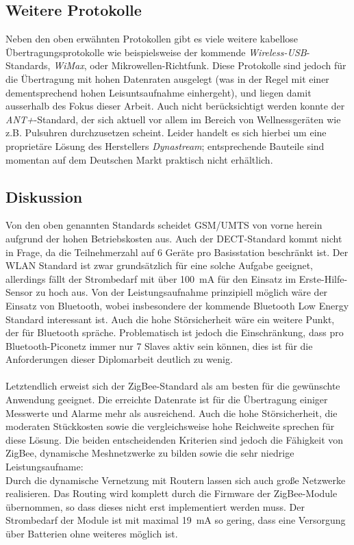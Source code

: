     \subsection{Weitere Protokolle}
        Neben den oben erwähnten Protokollen gibt es viele weitere kabellose Übertragungsprotokolle wie beispielsweise 
        der kommende \emph{Wireless-USB}-Standards, \emph{WiMax}, oder Mikrowellen-Richtfunk. Diese Protokolle sind 
        jedoch für die Übertragung mit hohen Datenraten ausgelegt (was in der Regel mit einer dementsprechend 
        hohen Leisuntsaufnahme einhergeht), und liegen damit ausserhalb des Fokus dieser Arbeit. Auch nicht
        berücksichtigt werden konnte der \emph{ANT+}-Standard, der sich aktuell vor allem im Bereich von Wellnessgeräten
        wie z.B. Pulsuhren durchzusetzen scheint. Leider handelt es sich hierbei um eine proprietäre Lösung des 
        Herstellers \emph{Dynastream}; entsprechende Bauteile sind momentan auf dem Deutschen Markt praktisch nicht
        erhältlich.


    \subsection{Diskussion}
        Von den oben genannten Standards scheidet GSM/UMTS von vorne herein aufgrund der hohen Betriebskosten aus.
        Auch der DECT-Standard kommt nicht in Frage, da die Teilnehmerzahl auf 6 Geräte pro Basisstation beschränkt ist.
        Der WLAN Standard ist zwar grundsätzlich für eine solche Aufgabe geeignet, allerdings fällt der Strombedarf mit
        über 100~mA für den Einsatz im Erste-Hilfe-Sensor zu hoch aus. Von der Leistungsaufnahme prinzipiell möglich wäre
        der Einsatz von Bluetooth, wobei insbesondere der kommende Bluetooth Low Energy Standard interessant ist. Auch die
        hohe Störsicherheit wäre ein weitere Punkt, der für Bluetooth spräche. Problematisch ist jedoch die Einschränkung,
        dass pro Bluetooth-Piconetz immer nur 7 Slaves aktiv sein können, dies ist für die Anforderungen dieser Diplomarbeit
        deutlich zu wenig.\\
        \\
        Letztendlich erweist sich der ZigBee-Standard als am besten für die gewünschte Anwendung geeignet. Die erreichte
        Datenrate ist für die Übertragung einiger Messwerte und Alarme mehr als ausreichend. Auch die hohe Störsicherheit,
        die moderaten Stückkosten sowie die vergleichsweise hohe Reichweite sprechen für diese Lösung. 
        Die beiden entscheidenden Kriterien sind jedoch die Fähigkeit von ZigBee, dynamische Meshnetzwerke zu bilden sowie
        die sehr niedrige Leistungsaufname:\\
        Durch die dynamische Vernetzung mit Routern lassen sich auch große Netzwerke realisieren. Das Routing wird komplett
        durch die Firmware der ZigBee-Module übernommen, so dass dieses nicht erst implementiert werden muss. Der Strombedarf
        der Module ist mit maximal 19~mA so gering, dass eine Versorgung über Batterien ohne weiteres möglich ist.

